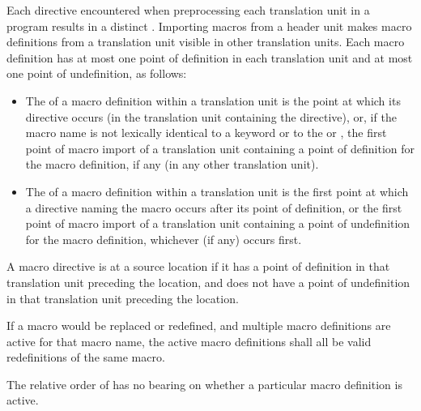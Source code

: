 \pnum
Each  directive encountered when preprocessing
each translation unit in a program results in a distinct
.
Importing macros from a header unit makes macro definitions
from a translation unit visible in other translation units.
Each macro definition has at most one point of definition in
each translation unit and at most one point of undefinition, as follows:
\begin{itemize}
\item
The 
of a macro definition within a translation unit
is the point at which its  directive occurs (in the translation
unit containing the  directive), or,
if the macro name is not lexically identical to a keyword
or to the   or ,
the first point
of macro import of a translation unit containing a point of definition for the
macro definition, if any (in any other translation unit).

\item
The 
of a macro definition within a translation unit
is the first point at which a  directive naming the macro occurs
after its point of definition, or the first point
of macro import of a translation unit containing a point of undefinition for the
macro definition, whichever (if any) occurs first.
\end{itemize}

\pnum
A macro directive is  at a source location
if it has a point of definition in that translation unit preceding the location,
and does not have a point of undefinition in that translation unit preceding
the location.

\pnum
If a macro would be replaced or redefined, and multiple macro definitions
are active for that macro name, the active macro definitions shall all be
valid redefinitions of the same macro.
\begin{note}
The relative order of  has no bearing on whether a
particular macro definition is active.
\end{note}

